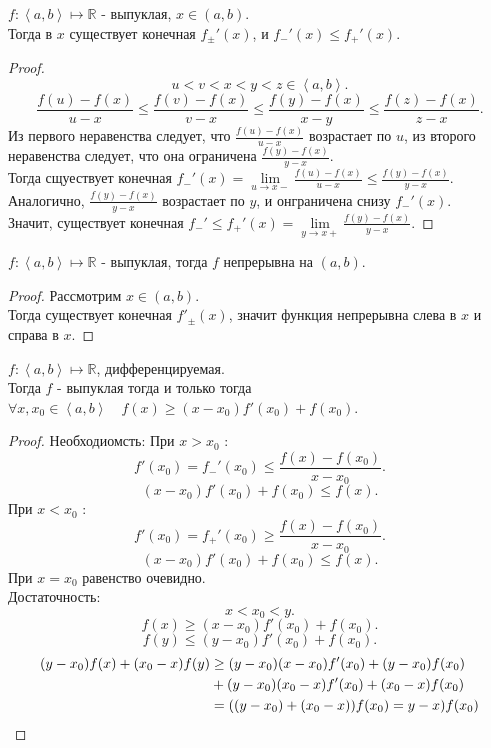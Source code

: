 \documentclass[11pt, oneside]{article}   	%
\begin{document}
\begin{theorem}
    $f: \left<a, b\right> \mapsto \mathbb{R}$ - выпуклая, $x\in \left( a, b \right) $.\\
    Тогда в $x$ существует конечная $f_{\pm}'(x)$, и $f_{-}'(x) \le f_{+}'(x)$.
    \begin{proof}
       \[ u < v < x < y < z\in \left<a, b\right> .\]
       \[ \frac{f(u)-f(x)}{u-x} \le \frac{f(v)-f(x)}{v-x} \le \frac{f(y)-f(x)}{x-y} \le \frac{f(z) - f(x)}{z-x} .\]
       Из первого неравенства следует, что $\frac{f(u)-f(x)}{u-x}$ возрастает по $u$, из второго неравенства следует, что она ограничена $\frac{f(y)-f(x)}{y-x}$.\\
       Тогда сщуествует конечная $f_{-}'(x) = \lim\limits_{u \to x-} \frac{f(u)-f(x)}{u-x} \le \frac{f(y)-f(x)}{y-x}$.\\
       Аналогично, $\frac{f(y)-f(x)}{y-x}$ возрастает по $y$, и онграничена снизу $f_{-}'(x)$.\\
       Значит, существует конечная $f_{-}' \le f_{+}'(x) = \lim\limits_{y \to x+} \frac{f(y)-f(x)}{y-x}$.
    \end{proof}
\end{theorem}
\begin{tlemma}
    $f : \left<a, b\right> \mapsto \mathbb{R}$ - выпуклая, тогда $f$ непрерывна на $\left( a, b \right) $.\\
    \begin{proof}
        Рассмотрим $x\in \left( a, b \right) $.\\
        Тогда существует конечная $f'_{\pm}(x)$, значит функция непрерывна слева в $x$ и справа в $x$.
    \end{proof}
\end{tlemma}
\begin{theorem}
    $f : \left<a, b\right> \mapsto \mathbb{R}$, дифференцируемая.\\
    Тогда $f$ - выпуклая тогда и только тогда $\forall{x, x_0\in \left<a, b\right>}\quad f(x) \ge (x-x_0)f'(x_0)+f(x_0)$.
    \begin{proof}
        Необходиомсть:
        При $x>x_0$ :
        \[ f'(x_0) = f_{-}'(x_0)\le  \frac{f(x)-f(x_0)}{x-x_0} .\]
        \[ (x-x_0)f'(x_0) + f(x_0) \le f(x) .\]
        При $x<x_0$ :
        \[ f'(x_0) = f_{+}'(x_0) \ge \frac{f(x)-f(x_0)}{x-x_0} .\]
        \[ (x-x_0)f'(x_0) + f(x_0) \le  f(x) .\]
        При $x=x_0$ равенство очевидно.\\
        Достаточность:
            \[ x < x_0 < y .\]
            \[ f(x) \ge (x-x_0)f'(x_0) + f(x_0) .\]
            \[ f(y) \le (y-x_0)f'(x_0) + f(x_0) .\]
            \begin{equation*}
                \begin{split}
                    (y-x_0)f(x) + (x_0-x)f(y) &\ge (y-x_0)(x-x_0)f'(x_0) + (y-x_0)f(x_0)\\
                                              &+(y-x_0)(x_0-x)f'(x_0)+(x_0-x)f(x_0)\\
                    &= ((y-x_0)+(x_0-x))f(x_0) = y-x)f(x_0) \qedhere
                \end{split}
            \end{equation*}
    \end{proof}
\end{theorem}
\end{document}
